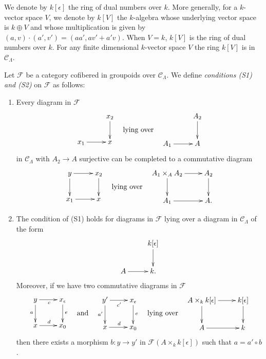 \medskip\noindent
We denote by $k[\epsilon]$ the ring of dual numbers over $k$.  More
generally, for a $k$-vector space $V$, we denote by $k[V]$ the $k$-algebra
whose underlying vector space is $k \oplus V$ and whose multiplication is given
by $(a, v) \cdot (a', v') = (aa', av' + a'v)$.  When $V = k$, $k[V]$ is the ring
of dual numbers over $k$.  For any finite dimensional $k$-vector space $V$
the ring $k[V]$ is in $\mathcal{C}_\Lambda$.

\begin{definition}
\label{definition-S1-S2}
Let $\mathcal{F}$ be a category cofibered in groupoids over $\mathcal
C_\Lambda$. We define {\it conditions (S1) and (S2)}
on $\mathcal{F}$ as follows:
\begin{enumerate}
\item[(S1)] Every diagram in $\mathcal{F}$
$$
\vcenter{
\xymatrix{
           & x_2 \ar[d] \\
x_1 \ar[r] & x
}
}
\quad\text{lying over}\quad
\vcenter{
\xymatrix{
           & A_2 \ar[d] \\
A_1 \ar[r] & A
}
}
$$
in $\mathcal{C}_\Lambda$ with $A_2 \to A$ surjective can be completed
to a commutative diagram
$$
\vcenter{
\xymatrix{
y \ar[r] \ar[d] & x_2 \ar[d] \\
x_1 \ar[r]      & x
}
}
\quad\text{lying over}\quad
\vcenter{
\xymatrix{
A_1 \times_A A_2 \ar[r] \ar[d] & A_2 \ar[d] \\
A_1 \ar[r]      & A.
}
}
$$
\item[(S2)]
The condition of (S1) holds for diagrams in $\mathcal{F}$ lying over
a diagram in $\mathcal{C}_\Lambda$ of the form
$$
\xymatrix{
          & k[\epsilon] \ar[d] \\
A  \ar[r] & k.
}
$$
Moreover, if we have two commutative diagrams in $\mathcal{F}$
$$
\vcenter{
\xymatrix{
y \ar[r]_c \ar[d]_a & x_\epsilon \ar[d]^e \\
x \ar[r]^d          & x_0
}
}
\quad\text{and}\quad
\vcenter{
\xymatrix{
y' \ar[r]_{c'} \ar[d]_{a'} & x_\epsilon \ar[d]^e \\
x \ar[r]^d                 & x_0
}
}
\quad\text{lying over}\quad
\vcenter{
\xymatrix{
A \times_k k[\epsilon] \ar[r] \ar[d] & k[\epsilon] \ar[d] \\
A  \ar[r] & k
}
}
$$
then there exists a morphism $b : y \to y'$ in
$\mathcal{F}(A \times_k k[\epsilon])$ such that $a = a' \circ b$.
\end{enumerate}
\end{definition}

